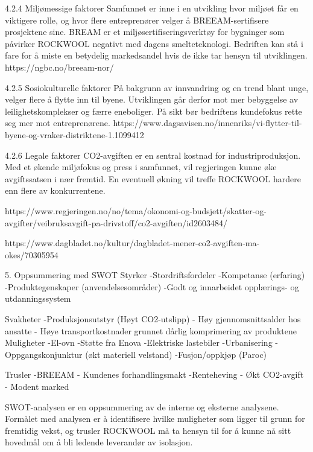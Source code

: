 4.2.4 Miljømessige faktorer
Samfunnet er inne i en utvikling hvor miljøet får en viktigere rolle, og hvor flere entreprenører velger å BREEAM-sertifisere prosjektene sine. BREAM er et miljøsertifiseringsverktøy for bygninger som påvirker ROCKWOOL negativt med dagens smelteteknologi. Bedriften kan stå i fare for å miste en betydelig markedsandel hvis de ikke tar hensyn til utviklingen. https://ngbc.no/breeam-nor/

4.2.5 Sosiokulturelle faktorer 
På bakgrunn av innvandring og en trend blant unge, velger flere å flytte inn til byene. Utviklingen går derfor mot mer bebyggelse av leilighetskomplekser og færre eneboliger. På sikt bør bedriftens kundefokus rette seg mer mot entreprenørene.
https://www.dagsavisen.no/innenriks/vi-flytter-til-byene-og-vraker-distriktene-1.1099412

4.2.6 Legale faktorer 
CO2-avgiften er en sentral kostnad for industriproduksjon. Med et økende miljøfokus og press i samfunnet, vil regjeringen kunne øke avgiftssatsen i nær fremtid. En eventuell økning vil treffe ROCKWOOL hardere enn flere av konkurrentene. 

https://www.regjeringen.no/no/tema/okonomi-og-budsjett/skatter-og-avgifter/veibruksavgift-pa-drivstoff/co2-avgiften/id2603484/

https://www.dagbladet.no/kultur/dagbladet-mener-co2-avgiften-ma-okes/70305954

5. Oppsummering med SWOT
Styrker
-Stordriftsfordeler
-Kompetanse (erfaring)
-Produktegenskaper (anvendelsesområder)
-Godt og innarbeidet opplærings- og utdanningssystem


Svakheter
-Produksjonsutstyr (Høyt CO2-utslipp)
- Høy gjennomsnittsalder hos ansatte
- Høye transportkostnader grunnet dårlig komprimering av produktene
Muligheter
-El-ovn
-Støtte fra Enova
-Elektriske lastebiler
-Urbanisering
-Oppgangskonjunktur (økt materiell velstand)
-Fusjon/oppkjøp (Paroc)


Trusler
-BREEAM
- Kundenes forhandlingsmakt
-Renteheving
- Økt CO2-avgift
- Modent marked





SWOT-analysen er en oppsummering av de interne og eksterne analysene. Formålet med analysen er å identifisere hvilke muligheter som ligger til grunn for fremtidig vekst, og trusler ROCKWOOL må ta hensyn til for å kunne nå sitt hovedmål om å bli ledende leverandør av isolasjon.


